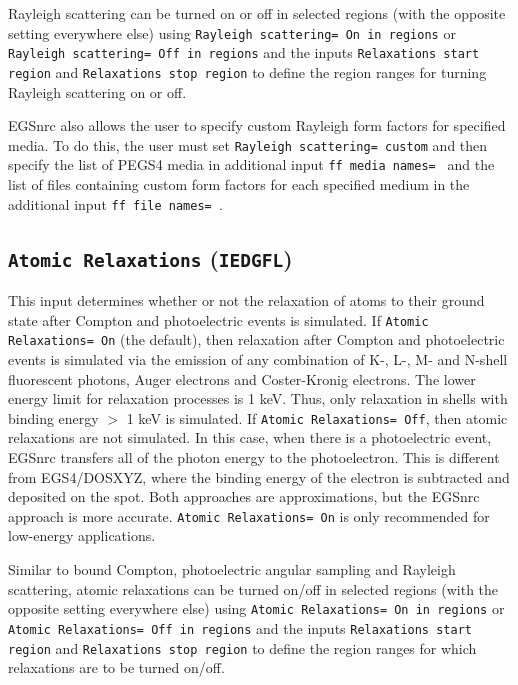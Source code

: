 \documentclass[12pt,twoside]{article}      %
\begin{document}
Rayleigh scattering can be turned on or off in selected regions
(with the opposite setting everywhere else) using
{\tt Rayleigh scattering= On in regions} or {\tt Rayleigh scattering= Off
in regions} and the inputs
{\tt Relaxations start region} and {\tt Relaxations stop region} to
define the region ranges for turning Rayleigh scattering on or off.

EGSnrc also allows the user to specify custom Rayleigh form factors for
specified media.  To do this, the user must
set {\tt Rayleigh scattering= custom} and then specify the list of
PEGS4 media in additional input {\tt ff media names= } and the list of
files containing custom form factors for each specified
medium in the additional input {\tt ff file names= }.

\subsection{{\tt Atomic Relaxations} ({\tt IEDGFL})}

This input determines whether or not the relaxation of atoms to their
ground state after Compton and photoelectric events is simulated.
If {\tt Atomic Relaxations= On} (the default), then relaxation after
Compton and photoelectric events is simulated via the
emission of any combination of K-, L-, M- and N-shell fluorescent photons, Auger electrons
and Coster-Kronig electrons.  The lower energy limit for relaxation processes
is 1 keV.  Thus, only relaxation in shells with binding energy $>$ 1 keV is
simulated.
If {\tt Atomic Relaxations= Off}, then atomic relaxations
are not simulated.  In this case, when there is a
photoelectric event, EGSnrc transfers all of the photon energy to the
photoelectron.  This is different from EGS4/DOSXYZ, where the binding energy
of the electron is subtracted and deposited on the spot.  Both approaches
are approximations, but the EGSnrc approach is more accurate.
{\tt Atomic Relaxations= On} is only recommended for low-energy applications.

Similar to bound Compton, photoelectric angular sampling and
Rayleigh scattering, atomic relaxations can be turned on/off in
selected regions (with the opposite setting everywhere else) using
{\tt Atomic Relaxations= On in regions} or
{\tt Atomic Relaxations= Off in regions} and the inputs
{\tt Relaxations start region} and {\tt Relaxations stop region} to define
the region ranges for which relaxations are to be turned on/off.
\end{document}
